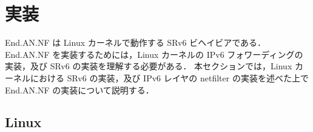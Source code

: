 \section{実装}
\label{section:implementation}
End.AN.NF は Linux カーネルで動作する SRv6 ビヘイビアである．
End.AN.NF を実装するためには，Linux カーネルの IPv6 フォワーディングの実装，及び SRv6 の実装を理解する必要がある．
本セクションでは，Linux カーネルにおける SRv6 の実装，及び IPv6 レイヤの netfilter の実装を述べた上で End.AN.NF の実装について説明する．

\subsection{Linux }
\label{sbsection:linux-packet-forwarding}
